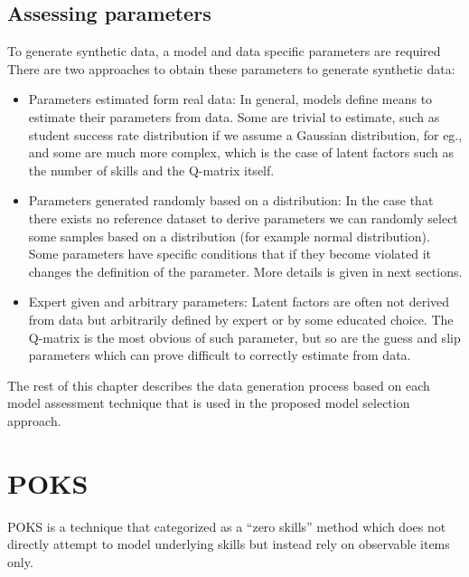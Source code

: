 \subsection{Assessing parameters}

To generate synthetic data, a model and data specific parameters are required There are two approaches to obtain these parameters to generate synthetic data:
\begin{itemize}
\item Parameters estimated form real data: In general, models define means to estimate their parameters from data.  Some are trivial to estimate, such as student success rate distribution if we assume a Gaussian distribution, for eg., and some are much more complex, which is the case of latent factors such as the number of skills and the Q-matrix itself.
\item Parameters generated randomly based on a distribution: In the case that there exists no reference dataset to derive parameters we can randomly select some samples based on a distribution (for example normal distribution). Some parameters have specific conditions that if they become violated it changes the definition of the parameter. More details is given in next sections.
\par{}
\item Expert given and arbitrary parameters: Latent factors are often not derived from data but arbitrarily defined by expert or by some educated choice.  The Q-matrix is the most obvious of such parameter, but so are the guess and slip parameters which can prove difficult to correctly estimate from data.

\end{itemize}


The rest of this chapter describes the data generation process based on each model assessment technique that is used in the proposed model selection approach.

\section{POKS}
POKS is a technique that categorized as a ``zero skills'' method which does not directly attempt to model underlying skills but instead rely on observable items only. 


